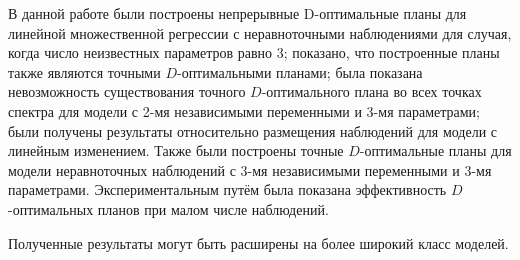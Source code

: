 В данной работе были построены непрерывные D-оптимальные планы для линейной множественной регрессии с неравноточными наблюдениями для случая, когда число неизвестных параметров равно 3; показано, что построенные планы также являются точными $D$-оптимальными планами; была показана невозможность существования точного $D$-оптимального плана во всех точках спектра для модели с 2-мя независимыми переменными и 3-мя параметрами; были получены результаты относительно размещения наблюдений для модели с линейным изменением. Также были построены точные $D$-оптимальные планы для модели неравноточных наблюдений с 3-мя независимыми переменными и 3-мя параметрами. Экспериментальным путём была показана эффективность $D$-оптимальных планов при малом числе наблюдений.

Полученные результаты могут быть расширены на более широкий класс моделей.